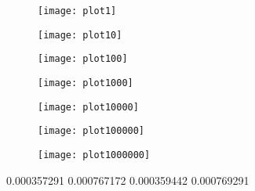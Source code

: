 \begin{figure}
\center
\texttt{[image: plot1]}
\label{plot1}
\end{figure}

\begin{figure}
\center
\texttt{[image: plot10]}
\label{plot10}
\end{figure}

\begin{figure}
\center
\texttt{[image: plot100]}
\label{plot100}
\end{figure}

\begin{figure}
\center
\texttt{[image: plot1000]}
\label{plot1000}
\end{figure}

\begin{figure}
\center
\texttt{[image: plot10000]}
\label{plot10000}
\end{figure}

\begin{figure}
\center
\texttt{[image: plot100000]}
\label{plot100000}
\end{figure}

\begin{figure}
\center
\texttt{[image: plot1000000]}
\label{plot1000000}
\end{figure}

0.000357291 0.000767172
0.000359442 0.000769291

